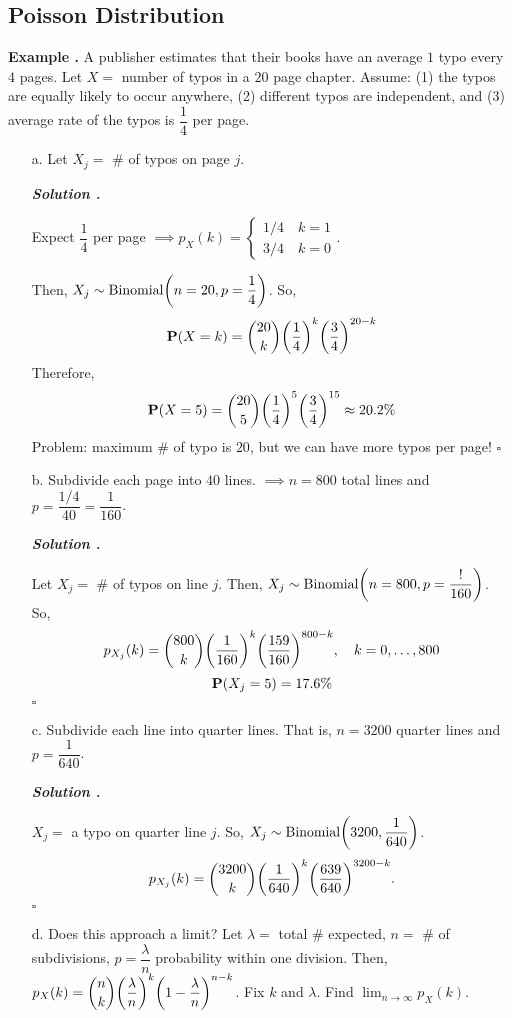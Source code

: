 \documentclass[12pt, a4paper]{article}
\newcounter{index}[subsection]
\newenvironment*{eg}{\begin{framed}\par\noindent\textbf{Example \thesubsection.\stepcounter{index}\theindex}}{\par\end{framed}}
\newcounter{nprf}[subsection]
\newenvironment*{sol}{\par\indent\textbf{\textit{Solution \stepcounter{nprf}\thenprf.}}\par}{\hfill{$\square$}\par}
\def\dsst{\displaystyle}
\def\P{\vb{P}}
\begin{document}
\subsection{Poisson Distribution}
\begin{eg}
	A publisher estimates that their books have an average $1$ typo every $4$ pages. Let $X=$ number of typos in a $20$ page chapter. Assume: (1) the typos are equally likely to occur anywhere, (2) different typos are independent, and (3) average rate of the typos is $\dfrac{1}{4}$ per page. 
	\begin{enumerate}
		\item[a.] Let $X_j=$ \# of typos on page $j$. 
		\begin{sol}
			Expect $\dfrac{1}{4}$ per page $\implies p_X(k)=\begin{cases}1/4\quad k=1\\3/4\quad k=0\end{cases}$.\par  Then, $X_j\sim\text{Binomial}\qty(n=20,p=\dfrac{1}{4})$. So, \[\P(X=k)=\binom{20}{k}\qty(\dfrac{1}{4})^k\qty(\dfrac{3}{4})^{20-k}\] Therefore, \[\P(X=5)=\binom{20}{5}\qty(\dfrac{1}{4})^5\qty(\dfrac{3}{4})^{15}\approx20.2\%\]
			Problem: maximum \# of typo is $20$, but we can have more typos per page!	
		\end{sol}
		\item[b.] Subdivide each page into $40$ lines. $\implies n=800$ total lines and $p=\dfrac{1/4}{40}=\dfrac{1}{160}$. 
		\begin{sol}
			Let $X_j=$ \# of typos on line $j$. Then, $X_j\sim\text{Binomial}\qty(n=800,p=\dfrac{!}{160})$. So, \[p_{X_j}(k)=\binom{800}{k}\qty(\dfrac{1}{160})^k\qty(\dfrac{159}{160})^{800-k},\quad k=0,\dots,800\]\[\P\qty(X_j=5)=17.6\%\]	
		\end{sol}
		\item[c.] Subdivide each line into quarter lines. That is, $n=3200$ quarter lines and $p=\dfrac{1}{640}$.
		\begin{sol}
			$X_j=$ a typo on quarter line $j$. So, $X_j\sim\text{Binomial}\qty(3200,\dfrac{1}{640})$. \[p_{X_j}(k)=\binom{3200}{k}\qty(\dfrac{1}{640})^k\qty(\dfrac{639}{640})^{3200-k}.\]	
		\end{sol}
		\item[d.] Does this approach a limit? Let $\lambda=$ total \# expected, $n=$ \# of subdivisions, $p=\dfrac{\lambda}{n}$ probability within one division. Then, $\dsst p_X(k)=\binom{n}{k}\qty(\dfrac{\lambda}{n})^k\qty(1-\dfrac{\lambda}{n})^{n-k}$. Fix $k$ and $\lambda$. Find $\dsst\lim_{n\to\infty}p_X(k)$.

\end{enumerate}
\end{eg}
\end{document}
